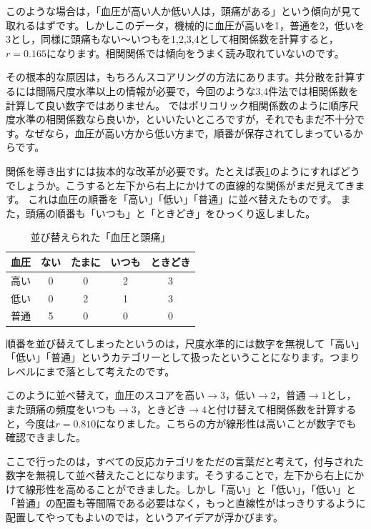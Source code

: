 \documentclass{ltjsbook}
\begin{document}
このような場合は，「血圧が高い人か低い人は，頭痛がある」という傾向が見て取れるはずです。しかしこのデータ，機械的に血圧が高いを1，普通を2，低いを3とし，同様に頭痛もない〜いつもを1,2,3,4として相関係数を計算すると，$r=0.165$になります。相関関係では傾向をうまく読み取れていないのです。

その根本的な原因は，もちろんスコアリングの方法にあります。共分散を計算するには間隔尺度水準以上の情報が必要で，今回のような3,4件法では相関係数を計算して良い数字ではありません。
ではポリコリック相関係数のように順序尺度水準の相関係数なら良いか，といいたいところですが，それでもまだ不十分です。なぜなら，血圧が高い方から低い方まで，順番が保存されてしまっているからです。

関係を導き出すには抜本的な改革が必要です。たとえば表\ref{tbl::14_02}のようにすればどうでしょうか。こうすると左下から右上にかけての直線的な関係がまだ見えてきます。
これは血圧の順番を「高い」「低い」「普通」に並べ替えたものです。
また，頭痛の順番も「いつも」と「ときどき」をひっくり返しました。
\begin{table}[h]
    \begin{center}
        \caption{並び替えられた「血圧と頭痛」}
        \begin{tabular}{c|cccc}
            血圧 & ない & たまに & いつも & ときどき \\
            \hline
            高い & 0  & 0   & 2   & 3    \\
            低い & 0  & 2   & 1   & 3    \\
            普通 & 5  & 0   & 0   & 0    \\
        \end{tabular}
        \label{tbl::14_02}
    \end{center}
\end{table}
順番を並び替えてしまったというのは，尺度水準的には数字を無視して「高い」「低い」「普通」というカテゴリーとして扱ったということになります。つまりレベルにまで落として考えたのです。

このように並べ替えて，血圧のスコアを高い$\to3$，低い$\to2$，普通$\to1$とし，また頭痛の頻度をいつも$\to3$，ときどき$\to4$と付け替えて相関係数を計算すると，今度は$r=0.810$になりました。こちらの方が線形性は高いことが数字でも確認できました。

ここで行ったのは，すべての反応カテゴリをただの言葉だと考えて，付与された数字を無視して並べ替えたことになります。そうすることで，左下から右上にかけて線形性を高めることができました。しかし「高い」と「低い」，「低い」と「普通」の配置も等間隔である必要はなく，もっと直線性がはっきりするように配置してやってもよいのでは，というアイデアが浮かびます。
\end{document}
